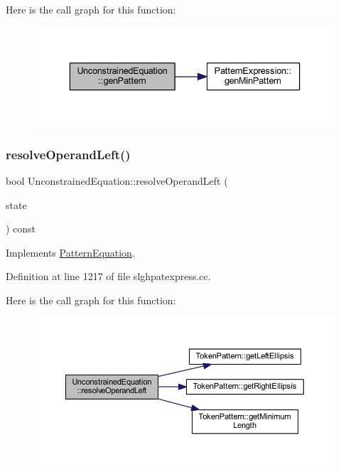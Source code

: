 Here is the call graph for this function\+:
\nopagebreak
\begin{figure}[H]
\begin{center}
\leavevmode
\includegraphics[width=336pt]{class_unconstrained_equation_a6b6c824615f9de7fba284e940cb11299_cgraph}
\end{center}
\end{figure}
\mbox{\label{class_unconstrained_equation_a9970189fd95bdb8ce0c30da626124510}} 
\subsubsection{\texorpdfstring{resolveOperandLeft()}{resolveOperandLeft()}}
{\footnotesize\ttfamily bool Unconstrained\+Equation\+::resolve\+Operand\+Left (\begin{DoxyParamCaption}\item[{\mbox{\hyperlink{struct_operand_resolve}{Operand\+Resolve}} \&}]{state }\end{DoxyParamCaption}) const\hspace{0.3cm}{\ttfamily [virtual]}}



Implements \mbox{\hyperlink{class_pattern_equation_a16e885a945df91e3daf2dea6394ae6f2}{Pattern\+Equation}}.



Definition at line 1217 of file slghpatexpress.\+cc.

Here is the call graph for this function\+:
\nopagebreak
\begin{figure}[H]
\begin{center}
\leavevmode
\includegraphics[width=350pt]{class_unconstrained_equation_a9970189fd95bdb8ce0c30da626124510_cgraph}
\end{center}
\end{figure}


